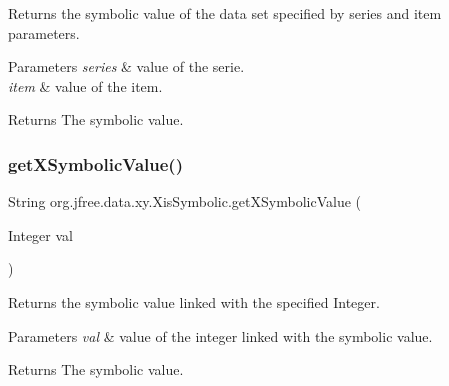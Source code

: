 Returns the symbolic value of the data set specified by {\ttfamily series} and {\ttfamily item} parameters.


\begin{DoxyParams}{Parameters}
{\em series} & value of the serie. \\
\hline
{\em item} & value of the item.\\
\hline
\end{DoxyParams}
\begin{DoxyReturn}{Returns}
The symbolic value. 
\end{DoxyReturn}
\mbox{\label{interfaceorg_1_1jfree_1_1data_1_1xy_1_1_xis_symbolic_ad0bc3d2cf3e0dcee0bcbe550ccdf3133}} 
\subsubsection{\texorpdfstring{get\+X\+Symbolic\+Value()}{getXSymbolicValue()}\hspace{0.1cm}{\footnotesize\ttfamily [2/2]}}
{\footnotesize\ttfamily String org.\+jfree.\+data.\+xy.\+Xis\+Symbolic.\+get\+X\+Symbolic\+Value (\begin{DoxyParamCaption}\item[{Integer}]{val }\end{DoxyParamCaption})}

Returns the symbolic value linked with the specified {\ttfamily Integer}.


\begin{DoxyParams}{Parameters}
{\em val} & value of the integer linked with the symbolic value.\\
\hline
\end{DoxyParams}
\begin{DoxyReturn}{Returns}
The symbolic value. 
\end{DoxyReturn}
\mbox{\label{interfaceorg_1_1jfree_1_1data_1_1xy_1_1_xis_symbolic_a711f34a1f69d0e0c9550fa0f8ad2c181}} 
